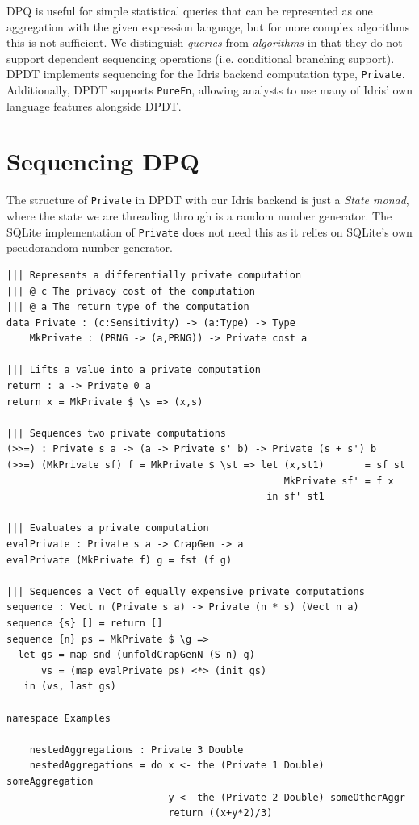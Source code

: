 \documentclass[12pt]{report}
\begin{document}
DPQ is useful for simple statistical queries that can be represented as one aggregation with the given expression language, but for more complex algorithms this is not sufficient.
We distinguish \textit{queries} from \textit{algorithms} in that they do not support dependent sequencing operations (i.e. conditional branching support).
DPDT implements sequencing for the Idris backend computation type, \texttt{Private}.
Additionally, DPDT supports \texttt{PureFn}, allowing analysts to use many of Idris' own language features alongside DPDT.

\section{Sequencing DPQ}

The structure of \texttt{Private} in DPDT with our Idris backend is just a \textit{State monad}, where the state we are threading through is a random number generator.
The SQLite implementation of \texttt{Private} does not need this as it relies on SQLite's own pseudorandom number generator.

\begin{lstlisting}[float,caption={Representing differentially private mechanisms},label={lst:mechanisms}]
||| Represents a differentially private computation
||| @ c The privacy cost of the computation
||| @ a The return type of the computation
data Private : (c:Sensitivity) -> (a:Type) -> Type
    MkPrivate : (PRNG -> (a,PRNG)) -> Private cost a

||| Lifts a value into a private computation
return : a -> Private 0 a
return x = MkPrivate $ \s => (x,s)

||| Sequences two private computations
(>>=) : Private s a -> (a -> Private s' b) -> Private (s + s') b
(>>=) (MkPrivate sf) f = MkPrivate $ \st => let (x,st1)       = sf st
                                                MkPrivate sf' = f x
                                             in sf' st1

||| Evaluates a private computation
evalPrivate : Private s a -> CrapGen -> a
evalPrivate (MkPrivate f) g = fst (f g)

||| Sequences a Vect of equally expensive private computations
sequence : Vect n (Private s a) -> Private (n * s) (Vect n a)
sequence {s} [] = return []
sequence {n} ps = MkPrivate $ \g =>
  let gs = map snd (unfoldCrapGenN (S n) g)
      vs = (map evalPrivate ps) <*> (init gs)
   in (vs, last gs)

namespace Examples

    nestedAggregations : Private 3 Double
    nestedAggregations = do x <- the (Private 1 Double) someAggregation
                            y <- the (Private 2 Double) someOtherAggr
                            return ((x+y*2)/3)
\end{lstlisting}
\end{document}
